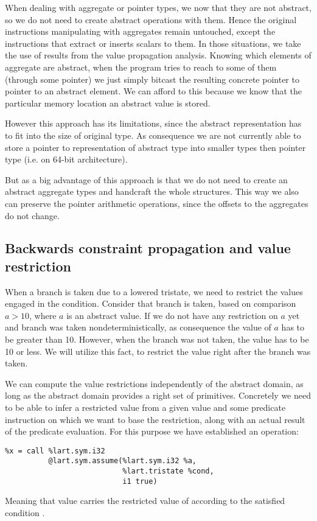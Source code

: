 When dealing with aggregate or pointer types, we now that they are not
abstract, so we do not need to create abstract operations with them. Hence the
original instructions manipulating with aggregates remain untouched, except the
instructions that extract or inserts scalars to them.
In those situations, we take the use of results from the value propagation analysis.
Knowing which elements of aggregate are abstract, when the program tries to
reach to some of them (through some pointer) we just simply bitcast
the resulting concrete pointer to pointer to an abstract element. We can afford
to this because we know that the particular memory location an abstract value is
stored.

However this approach has its limitations, since the abstract representation has
to fit into the size of original type. As consequence we are not currently able
to store a pointer to representation of abstract type into smaller types then
pointer type (i.e.  on 64-bit architecture).

But as a big advantage of this approach is that we do not need to create an
abstract aggregate types and handcraft the whole structures. This way we also
can preserve the pointer arithmetic operations, since the offsets to the
aggregates do not change.

\subsection{Backwards constraint propagation and value restriction}
When a branch is taken due to a lowered tristate, we need to restrict the values
engaged in the condition. Consider that branch is taken, based on comparison $a
> 10$, where $a$ is an abstract value. If we do not have any restriction on $a$
yet and branch was taken nondeterministically, as consequence the value of $a$
has to be greater than 10. However, when the branch was not taken,
the value has to be 10 or less. We will utilize this fact, to restrict the value
right after the branch was taken.

We can compute the value restrictions independently of the abstract domain, as
long as the abstract domain provides a right set of primitives. Concretely we
need to be able to infer a restricted value from a given value and some predicate
instruction on which we want to base the restriction, along with an actual
result of the predicate evaluation. For this purpose we have established
an  operation:
\begin{verbatim}
%x = call %lart.sym.i32
          @lart.sym.assume(%lart.sym.i32 %a,
                           %lart.tristate %cond,
                           i1 true)
\end{verbatim}
Meaning that value  carries the restricted value of 
according to the satisfied condition .

